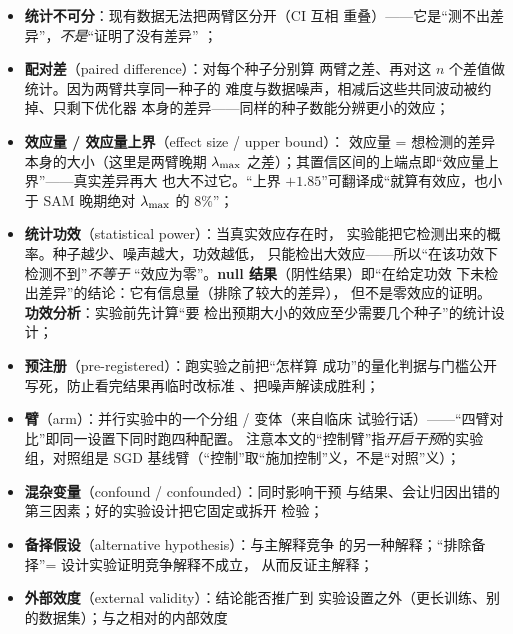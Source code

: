 \begin{itemize}
        $w{=}5$，``滚动均值 window 5''即此：慢变化趋势的局部估计），
        只留涨落\emph{残差}再做相关。必要性：两条同向单调漂移的曲线
        即使涨落彼此无关，原始 Pearson 也接近 $+1$——共同趋势制造的
        假相关；去趋势后问的才是``涨落是否同步''。展开解释与袖珍
        反例见第~\ref{sec:ch03-stats}~节。
  \item \textbf{统计不可分}：现有数据无法把两臂区分开（CI 互相
        重叠）——它是``测不出差异''，\emph{不是}``证明了没有差异''
        ；
  \item \textbf{配对差}（paired difference）：对每个种子分别算
        两臂之差、再对这 $n$ 个差值做统计。因为两臂共享同一种子的
        难度与数据噪声，相减后这些共同波动被约掉、只剩下优化器
        本身的差异——同样的种子数能分辨更小的效应；
  \item \textbf{效应量 / 效应量上界}（effect size / upper bound）：
        效应量 = 想检测的差异本身的大小（这里是两臂晚期 $\lambda_{\max}$
        之差）；其置信区间的上端点即``效应量上界''——真实差异再大
        也大不过它。``上界 $+1.85$''可翻译成``就算有效应，也小于
        SAM 晚期绝对 $\lambda_{\max}$ 的 $8\%$''；
  \item \textbf{统计功效}（statistical power）：当真实效应存在时，
        实验能把它检测出来的概率。种子越少、噪声越大，功效越低，
        只能检出大效应——所以``在该功效下检测不到''\emph{不等于}
        ``效应为零''。\textbf{null 结果}（阴性结果）即``在给定功效
        下未检出差异''的结论：它有信息量（排除了较大的差异），
        但不是零效应的证明。\textbf{功效分析}：实验前先计算``要
        检出预期大小的效应至少需要几个种子''的统计设计；
  \item \textbf{预注册}（pre-registered）：跑实验之前把``怎样算
        成功''的量化判据与门槛公开写死，防止看完结果再临时改标准
        、把噪声解读成胜利；
  \item \textbf{臂}（arm）：并行实验中的一个分组 / 变体（来自临床
        试验行话）——``四臂对比''即同一设置下同时跑四种配置。
        注意本文的``控制臂''指\emph{开启干预}的实验组，对照组是
        SGD 基线臂（``控制''取``施加控制''义，不是``对照''义）；
  \item \textbf{混杂变量}（confound / confounded）：同时影响干预
        与结果、会让归因出错的第三因素；好的实验设计把它固定或拆开
        检验；
  \item \textbf{备择假设}（alternative hypothesis）：与主解释竞争
        的另一种解释；``排除备择''= 设计实验证明竞争解释不成立，
        从而反证主解释；
  \item \textbf{外部效度}（external validity）：结论能否推广到
        实验设置之外（更长训练、别的数据集）；与之相对的内部效度

\end{itemize}
